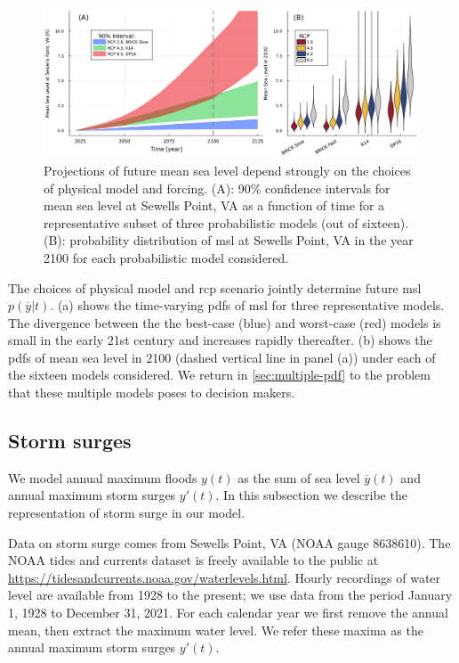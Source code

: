 \documentclass[12pt]{article}
\begin{document}
\begin{figure}
    \centering
    \includegraphics[width=\textwidth]{lsl-evolution}
    \caption{
        Projections of future mean sea level depend strongly on the choices of physical model and forcing.
        (A): 90\% confidence intervals for mean sea level at Sewells Point, VA as a function of time for a representative subset of three probabilistic models (out of sixteen).
        (B): probability distribution of \gls{msl} at Sewells Point, VA in the year 2100 for each probabilistic model considered.
    }\label{fig:lsl-evolution}
\end{figure}

The choices of physical model and \gls{rcp} scenario jointly determine future \gls{msl} $p(\overline{y}|t)$.
(a) shows the time-varying \glspl{pdf} of \gls{msl} for three representative models.
The divergence between the the best-case (blue) and worst-case (red) models is small in the early 21st century and increases rapidly thereafter.
(b) shows the \glspl{pdf} of mean sea level in 2100 (dashed vertical line in panel (a)) under each of the sixteen models considered.
We return in \cref{sec:multiple-pdf} to the problem that these multiple models poses to decision makers.

\subsection{Storm surges}\label{sec:storm-surge}

We model annual maximum floods $y(t)$ as the sum of sea level $\overline{y}(t)$ and annual maximum storm surges $y'(t)$.
In this subsection we describe the representation of storm surge in our model.

Data on storm surge comes from Sewells Point, VA (NOAA gauge 8638610).
The NOAA tides and currents dataset is freely available to the public at \url{https://tidesandcurrents.noaa.gov/waterlevels.html}.
Hourly recordings of water level are available from 1928 to the present; we use data from the period January 1, 1928 to December 31, 2021.
For each calendar year we first remove the annual mean, then extract the maximum water level.
We refer these maxima as the annual maximum storm surges $y'(t)$.
\end{document}
